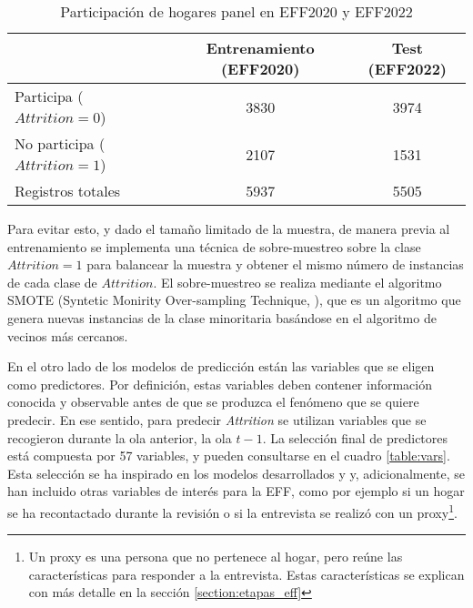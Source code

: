 \begin{table}[htbp]
\begin{tabular}{lcc}
 & \textbf{Entrenamiento (EFF2020)} & \textbf{Test (EFF2022)} \\ \hline
Participa ($Attrition = 0$) & 3830 & 3974 \\
No participa ($Attrition = 1$) & 2107 & 1531 \\ \hline
Registros totales & 5937 & 5505
\end{tabular}
\caption{Participación de hogares panel en EFF2020 y EFF2022}
\label{table:attrition}
\end{table}

Para evitar esto, y dado el tamaño limitado de la muestra, de manera previa al entrenamiento se implementa una técnica de sobre-muestreo sobre la clase $Attrition=1$ para balancear la muestra y obtener el mismo número de instancias de cada clase de $Attrition$. El sobre-muestreo se realiza mediante el algoritmo SMOTE (Syntetic Monirity Over-sampling Technique, \cite{chawla2002smote}), que es un algoritmo que genera nuevas instancias de la clase minoritaria basándose en el algoritmo de vecinos más cercanos.

En el otro lado de los modelos de predicción están las variables que se eligen como predictores. Por definición, estas variables deben contener información conocida y observable antes de que se produzca el fenómeno que se quiere predecir. En ese sentido, para predecir \textit{Attrition} se utilizan variables que se recogieron durante la ola anterior, la ola $t-1$. La selección final de predictores está compuesta por 57 variables, y pueden consultarse en el cuadro \ref{table:vars}. Esta selección se ha inspirado en los modelos desarrollados \cite{kern2021predicting} y \cite{beste2023case} y, adicionalmente, se han incluido otras variables de interés para la EFF, como por ejemplo si un hogar se ha recontactado durante la revisión o si la entrevista se realizó con un proxy\footnote{Un proxy es una persona que no pertenece al hogar, pero reúne las características para responder a la entrevista. Estas características se explican con más detalle en la sección \ref{section:etapas_eff}}.

